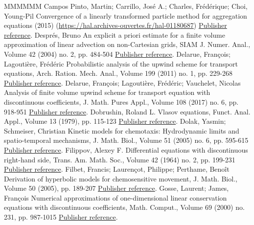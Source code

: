 \documentclass[11pt]{article}
\theoremstyle{definition}
\numberwithin{equation}{section}
\begin{document}
\begin{thebibliography}{MMMMMM}
 Campos Pinto, Martin; Carrillo, José A.; Charles, Frédérique; Choi, Young-Pil Convergence of a linearly transformed particle method for aggregation equations (2015) (\url{https://hal.archives-ouvertes.fr/hal-01180687}) \href{https://ahl.centre-mersenne.org/item/AHL_2020__3__217_0/#Freda}{Publisher reference}.
 Després, Bruno An explicit a priori estimate for a finite volume approximation of linear advection on non-Cartesian grids, SIAM J. Numer. Anal., Volume 42 (2004) no. 2, pp. 484-504 \href{https://ahl.centre-mersenne.org/item/AHL_2020__3__217_0/#Despres}{Publisher reference}.
 Delarue, François; Lagoutière, Frédéric Probabilistic analysis of the upwind scheme for transport equations, Arch. Ration. Mech. Anal., Volume 199 (2011) no. 1, pp. 229-268 \href{https://ahl.centre-mersenne.org/item/AHL_2020__3__217_0/#caniveau}{Publisher reference}.
 Delarue, François; Lagoutière, Frédéric; Vauchelet, Nicolas Analysis of finite volume upwind scheme for transport equation with discontinuous coefficients, J. Math. Pures Appl., Volume 108 (2017) no. 6, pp. 918-951 \href{https://ahl.centre-mersenne.org/item/AHL_2020__3__217_0/#DLV}{Publisher reference}.
 Dobrushin, Roland L. Vlasov equations, Funct. Anal. Appl., Volume 13 (1979), pp. 115-123 \href{https://ahl.centre-mersenne.org/item/AHL_2020__3__217_0/#dob}{Publisher reference}.
 Dolak, Yasmin; Schmeiser, Christian Kinetic models for chemotaxis: Hydrodynamic limits and spatio-temporal mechanisms, J. Math. Biol., Volume 51 (2005) no. 6, pp. 595-615 \href{https://ahl.centre-mersenne.org/item/AHL_2020__3__217_0/#dolschmeis}{Publisher reference}.
 Filippov, Alexey F. Differential equations with discontinuous right-hand side, Trans. Am. Math. Soc., Volume 42 (1964) no. 2, pp. 199-231 \href{https://ahl.centre-mersenne.org/item/AHL_2020__3__217_0/#Filippov}{Publisher reference}.
 Filbet, Francis; Laurençot, Philippe; Perthame, Benoît Derivation of hyperbolic models for chemosensitive movement, J. Math. Biol., Volume 50 (2005), pp. 189-207 \href{https://ahl.centre-mersenne.org/item/AHL_2020__3__217_0/#filblaurpert}{Publisher reference}.
 Gosse, Laurent; James, François Numerical approximations of one-dimensional linear conservation equations with discontinuous coefficients, Math. Comput., Volume 69 (2000) no. 231, pp. 987-1015 \href{https://ahl.centre-mersenne.org/item/AHL_2020__3__217_0/#GJ}{Publisher reference}.

\end{thebibliography}
\end{document}
